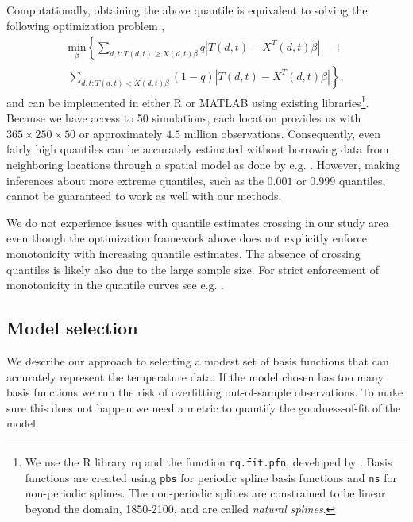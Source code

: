 \documentclass{ametsoc}
\begin{document}
Computationally, obtaining the above quantile is equivalent to solving the following optimization problem \citep{koenker1978regression},
\begin{multline}
\underset{\beta}{\text{min}}\left\{ \sum_{d,t: T(d, t) \geq X(d, t)\beta} q|T(d,t) - X^T(d,t)\beta| \right. \quad+  \\
 \left. \sum_{d,t: T(d, t) < X(d, t)\beta} (1 - q)|T(d,t) - X^T(d,t)\beta| \right\},
\end{multline}
and can be implemented in either R or MATLAB using existing libraries\footnote{We use the R library rq and the function \texttt{rq.fit.pfn}, developed by \citet{portnoy1997gaussian}. Basis functions are created using \texttt{pbs} for periodic spline basis functions and \texttt{ns} for non-periodic splines. The non-periodic splines are constrained to be linear beyond the domain, 1850-2100, and are called \emph{natural splines}.}. Because we have access to 50 simulations, each location provides us with $365 \times 250 \times 50$ or approximately $4.5$ million observations. Consequently, even fairly high quantiles can be accurately estimated without borrowing data from neighboring locations through a spatial model as done by e.g. \citet{reich2011bayesian}. However, making inferences about more extreme quantiles, such as the  $0.001$ or $0.999$ quantiles, cannot be guaranteed to work as well with our methods.

We do not experience issues with quantile estimates crossing in our study area even though the optimization framework above does not explicitly enforce monotonicity with increasing quantile estimates. The absence of crossing quantiles is likely also due to the large sample size. For strict enforcement of monotonicity in the quantile curves see e.g. \citet{bondell2010noncrossing}.

\subsection{Model selection}
 We describe our approach to selecting a modest set of basis functions that can accurately represent the temperature data. If the model chosen has too many basis functions we run the risk of overfitting out-of-sample observations. To make sure this does not happen we need a metric to quantify the goodness-of-fit of the model. 
\end{document}
